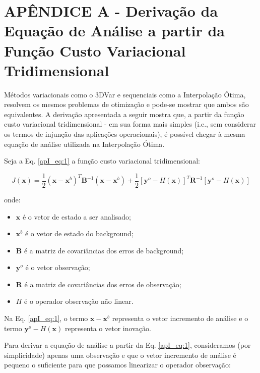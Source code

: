 
\chapter{APÊNDICE A - Derivação da Equação de Análise a partir da Função Custo Variacional Tridimensional}
\label{apendiceI}

Métodos variacionais como o 3DVar e sequenciais como a Interpolação Ótima, resolvem os mesmos problemas de otimização e pode-se mostrar que ambos são equivalentes. A derivação apresentada a seguir mostra que, a partir da função custo variacional tridimensional - em sua forma mais simples (i.e., sem considerar os termos de injunção das aplicações operacionais), é possível chegar à mesma equação de análise utilizada na Interpolação Ótima.

Seja a Eq. \ref{apI_eq:1} a função custo variacional tridimensional:

\begin{equation}
  \label{apI_eq:1}
  J(\mathbf{x}) = \frac{1}{2}(\mathbf{x} - \mathbf{x}^{b})^{T}\mathbf{B}^{-1}(\mathbf{x} - \mathbf{x}^{b}) + \frac{1}{2}[\mathbf{y}^{o} - \textit{H}(\mathbf{x})]^{T}\mathbf{R}^{-1}[\mathbf{y}^{o} - \textit{H}(\mathbf{x})]
\end{equation}

onde:

\begin{itemize}
  \item $\mathbf{x}$ é o vetor de estado a ser analisado;
  \item $\mathbf{x}^{b}$ é o vetor de estado do background;
  \item $\mathbf{B}$ é a matriz de covariâncias dos erros de background;
  \item $\mathbf{y}^{o}$ é o vetor observação;
  \item $\mathbf{R}$ é a matriz de covariâncias dos erros de observação;
  \item $\textit{H}$ é o operador observação não linear.
\end{itemize}

Na Eq. \ref{apI_eq:1}, o termo $\mathbf{x} - \mathbf{x}^{b}$ representa o vetor incremento de análise e o termo $\mathbf{y}^{o} - \textit{H}(\mathbf{x})$ representa o vetor inovação.

Para derivar a equação de análise a partir da Eq. \ref{apI_eq:1}, consideramos (por simplicidade) apenas uma observação e que o vetor incremento de análise é pequeno o suficiente para que possamos linearizar o operador observação:

